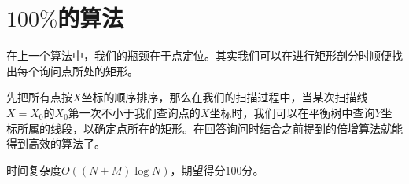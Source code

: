 \documentclass[a4paper]{article}
\begin{document}
\section{$100\%$的算法}
在上一个算法中，我们的瓶颈在于点定位。其实我们可以在进行矩形剖分时顺便找出每个询问点所处的矩形。 \par
先把所有点按$X$坐标的顺序排序，那么在我们的扫描过程中，当某次扫描线$X=X_0$的$X_0$第一次不小于我们查询点的$X$坐标时，我们可以在平衡树中查询$Y$坐标所属的线段，以确定点所在的矩形。在回答询问时结合之前提到的倍增算法就能得到高效的算法了。 \par
时间复杂度$O((N+M)\log{N})$，期望得分$100$分。
\end{document}
